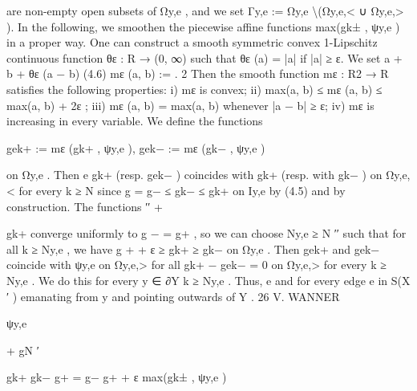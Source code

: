 \documentclass[
  10pt,
]{article}
\newenvironment{Shaded}{}{}
\newcommand{\NormalTok}[1]{#1}
\begin{document}
\begin{Shaded}
\begin{Highlighting}[]
\NormalTok{are non{-}empty open subsets of Ωy,e , and we set Γy,e := Ωy,e \textbackslash{}(Ωy,e,\textless{} ∪ Ωy,e,\textgreater{} ).}
\NormalTok{   In the following, we smoothen the piecewise affine functions max(gk± , ψy,e ) in a proper}
\NormalTok{way. One can construct a smooth symmetric convex 1{-}Lipschitz continuous function}
\NormalTok{θε : R → (0, ∞) such that θε (a) = |a| if |a| ≥ ε. We set}
\NormalTok{                                                    a + b + θε (a − b)}
\NormalTok{(4.6)                                mε (a, b) :=                      .}
\NormalTok{                                                            2}
\NormalTok{  Then the smooth function mε : R2 → R satisfies the following properties:}
\NormalTok{      i) mε is convex;}
\NormalTok{     ii) max(a, b) ≤ mε (a, b) ≤ max(a, b) + 2ε ;}
\NormalTok{    iii) mε (a, b) = max(a, b) whenever |a − b| ≥ ε;}
\NormalTok{    iv) mε is increasing in every variable.}
\NormalTok{We define the functions}

\NormalTok{                                          gek+ := mε (gk+ , ψy,e ),}
\NormalTok{                                           gek− := mε (gk− , ψy,e )}

\NormalTok{on Ωy,e . Then e gk+ (resp. gek− ) coincides with gk+ (resp. with gk− ) on Ωy,e,\textless{} for every}
\NormalTok{k ≥ N since g = g− ≤ gk− ≤ gk+ on Iy,e by (4.5) and by construction. The functions}
\NormalTok{       ′′       +}

\NormalTok{gk+ converge uniformly to g − = g+ , so we can choose Ny,e ≥ N ′′ such that for all k ≥ Ny,e ,}
\NormalTok{we have g + + ε ≥ gk+ ≥ gk− on Ωy,e . Then gek+ and gek− coincide with ψy,e on Ωy,e,\textgreater{} for all}
\NormalTok{                 gk+ − gek− = 0 on Ωy,e,\textgreater{} for every k ≥ Ny,e . We do this for every y ∈ ∂Y}
\NormalTok{k ≥ Ny,e . Thus, e}
\NormalTok{and for every edge e in S(X ′ ) emanating from y and pointing outwards of Y .}
\NormalTok{26                                              V. WANNER}


\NormalTok{                                                                                 ψy,e}




\NormalTok{                                                                           +}
\NormalTok{                                                                          gN  ′}

\NormalTok{                                                                          gk+}
\NormalTok{                                                                          gk− g+ = g−}
\NormalTok{                        g+ + ε}
\NormalTok{               max(gk± , ψy,e )}



\end{Highlighting}
\end{Shaded}
\end{document}
